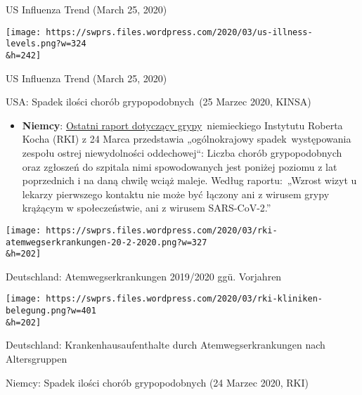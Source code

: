 US Influenza Trend (March 25, 2020)

\href{https://swprs.org/covid-19-hinweis-ii/us-illness-levels/}{}

\texttt{[image: https://swprs.files.wordpress.com/2020/03/us-illness-levels.png?w=324\\\&h=242]}

US Influenza Trend (March 25, 2020)

USA: Spadek ilości chorób grypopodobnych~(25 Marzec 2020, KINSA)

\begin{itemize}
\tightlist
\item
  \textbf{Niemcy}:
  \href{https://influenza.rki.de/Wochenberichte/2019_2020/2020-12.pdf}{Ostatni
  raport dotyczący grypy}~niemieckiego Instytutu Roberta Kocha (RKI) z
  24 Marca przedstawia „ogólnokrajowy spadek~występowania zespołu ostrej
  niewydolności oddechowej``: Liczba chorób grypopodobnych oraz zgłoszeń
  do szpitala nimi spowodowanych jest poniżej poziomu z lat poprzednich
  i na daną chwilę wciąż maleje. Według raportu:~„Wzrost wizyt u lekarzy
  pierwszego kontaktu nie może być łączony ani z wirusem grypy krążącym
  w społeczeństwie, ani z wirusem SARS-CoV-2.''
\end{itemize}

\href{https://swprs.org/covid-19-hinweis-ii/rki-atemwegserkrankungen-20-2-2020/}{}

\texttt{[image: https://swprs.files.wordpress.com/2020/03/rki-atemwegserkrankungen-20-2-2020.png?w=327\\\&h=202]}

Deutschland: Atemwegserkrankungen 2019/2020 ggü. Vorjahren

\href{https://swprs.org/covid-19-hinweis-ii/rki-kliniken-belegung/}{}

\texttt{[image: https://swprs.files.wordpress.com/2020/03/rki-kliniken-belegung.png?w=401\\\&h=202]}

Deutschland: Krankenhausaufenthalte durch Atemwegserkrankungen nach
Altersgruppen

Niemcy: Spadek ilości chorób grypopodobnych (24 Marzec 2020, RKI)

